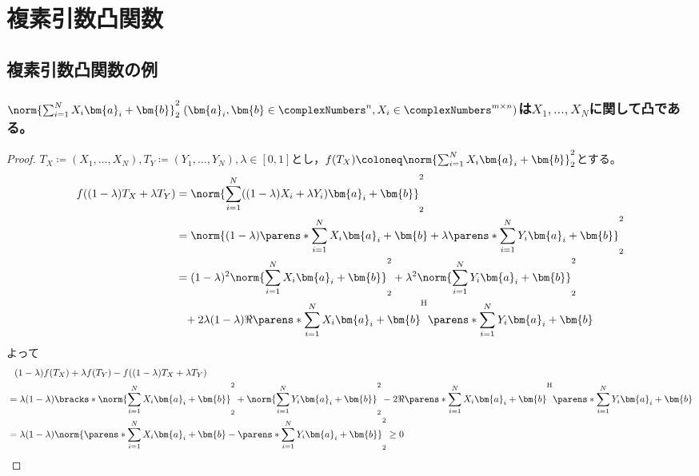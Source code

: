 \chapter{複素引数凸関数}
    \section{複素引数凸関数の例}
        \label{複素引数凸関数の例}
        \subsection{\texorpdfstring{$\norm{\sum_{i=1}^N X_i\bm{a}_i + \bm{b}}_2^2\;(\bm{a}_i, \bm{b} \in \complexNumbers^n,X_i \in \complexNumbers^{m\times n})$}{行列X1,X2,...,XNの線形結合×ベクトル+定数のノルム}は\texorpdfstring{$X_1,\dotsc,X_N$}{X1,X2,...,XN}に関して凸である。}
            \begin{proof}
                \quad\par
                $T_X \coloneq (X_1,\dotsc,X_N),T_Y \coloneq (Y_1,\dotsc,Y_N),\lambda \in [0,1]$とし，$f(T_X) \coloneq \norm{\sum_{i=1}^N X_i\bm{a}_i + \bm{b}}_2^2$とする。
                \begin{align*}
                    f((1-\lambda)T_X + \lambda T_Y) &= \norm{\sum_{i=1}^N ((1-\lambda)X_i + \lambda Y_i)\bm{a}_i + \bm{b}}_2^2 \\
                    &= \norm{(1-\lambda)\parens*{\sum_{i=1}^N X_i\bm{a}_i + \bm{b}} + \lambda\parens*{\sum_{i=1}^N Y_i\bm{a}_i + \bm{b}}}_2^2 \\
                    &= (1-\lambda)^2\norm{\sum_{i=1}^N X_i\bm{a}_i + \bm{b}}_2^2 + \lambda^2\norm{\sum_{i=1}^N Y_i\bm{a}_i + \bm{b}}_2^2 \\
                    &\phantom{=} + 2\lambda(1-\lambda)\Re{\parens*{\sum_{i=1}^N X_i\bm{a}_i + \bm{b}}^\mathrm{H}\parens*{\sum_{i=1}^N Y_i\bm{a}_i + \bm{b}}}
                \end{align*}
                よって
                \begin{align*}
                    &\phantom{=} (1-\lambda)f(T_X) + \lambda f(T_Y) - f((1-\lambda)T_X + \lambda T_Y) \\
                    &= \lambda(1-\lambda)\bracks*{\norm{\sum_{i=1}^N X_i\bm{a}_i + \bm{b}}_2^2 + \norm{\sum_{i=1}^N Y_i\bm{a}_i + \bm{b}}_2^2 - 2\Re{\parens*{\sum_{i=1}^N X_i\bm{a}_i + \bm{b}}^\mathrm{H}\parens*{\sum_{i=1}^N Y_i\bm{a}_i + \bm{b}}}} \\
                    &= \lambda(1-\lambda)\norm{\parens*{\sum_{i=1}^N X_i\bm{a}_i + \bm{b}} - \parens*{\sum_{i=1}^N Y_i\bm{a}_i + \bm{b}}}_2^2 \geq 0
                \end{align*}
            \end{proof}

